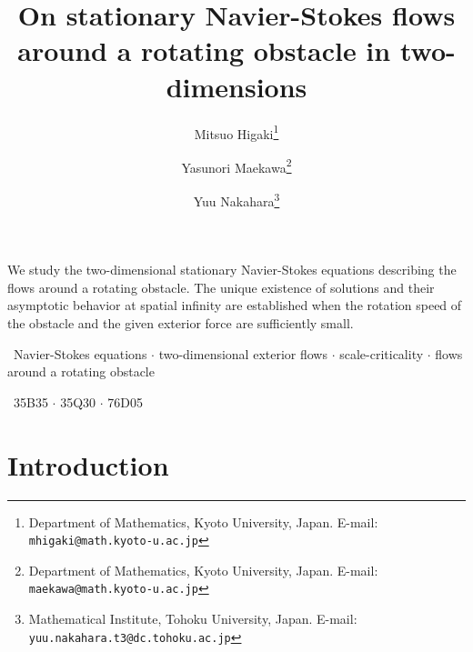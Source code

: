 \documentclass[11pt,a4paper]{article}
\begin{document}
\title{On stationary Navier-Stokes flows around a rotating obstacle in two-dimensions}
\author{Mitsuo Higaki\thanks{Department of Mathematics, Kyoto University, Japan. E-mail: \texttt{mhigaki@math.kyoto-u.ac.jp}} \and Yasunori Maekawa\thanks{Department of Mathematics, Kyoto University, Japan. E-mail: \texttt{maekawa@math.kyoto-u.ac.jp}} \and Yuu Nakahara\thanks{Mathematical Institute, Tohoku University, Japan. E-mail: \texttt{yuu.nakahara.t3@dc.tohoku.ac.jp}}}


\date{}

\maketitle


We study the two-dimensional stationary Navier-Stokes equations 
describing the flows around a rotating obstacle. 
The unique existence of solutions and their asymptotic behavior at spatial infinity are established
when the rotation speed of the obstacle and the given exterior force are sufficiently small. 

\vspace{0.3cm}

\, Navier-Stokes equations $\cdot$ two-dimensional exterior flows $\cdot$ scale-criticality $\cdot$ flows around a rotating obstacle

\vspace{0.3cm}

\, 35B35 $\cdot$ 35Q30 $\cdot$ 76D05







\section{Introduction}\label{intro}
\end{document}
